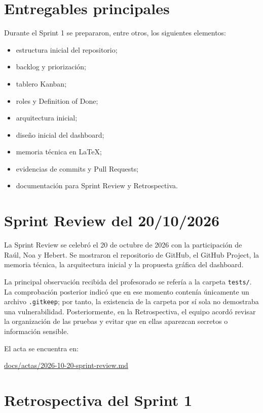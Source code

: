 \documentclass[11pt,a4paper,oneside]{report}
\newcommand{\src}[2]{\href{#1}{#2}}
\begin{document}
\section{Entregables principales}

Durante el Sprint 1 se prepararon, entre otros, los siguientes elementos:

\begin{itemize}
\item estructura inicial del repositorio;
\item backlog y priorización;
\item tablero Kanban;
\item roles y Definition of Done;
\item arquitectura inicial;
\item diseño inicial del dashboard;
\item memoria técnica en LaTeX;
\item evidencias de commits y Pull Requests;
\item documentación para Sprint Review y Retrospectiva.
\end{itemize}

\section{Sprint Review del 20/10/2026}

La Sprint Review se celebró el 20 de octubre de 2026 con la participación de Raúl, Noa y Hebert. Se mostraron el repositorio de GitHub, el GitHub Project, la memoria técnica, la arquitectura inicial y la propuesta gráfica del dashboard.

La principal observación recibida del profesorado se refería a la carpeta \texttt{tests/}. La comprobación posterior indicó que en ese momento contenía únicamente un archivo \texttt{.gitkeep}; por tanto, la existencia de la carpeta por sí sola no demostraba una vulnerabilidad. Posteriormente, en la Retrospectiva, el equipo acordó revisar la organización de las pruebas y evitar que en ellas aparezcan secretos o información sensible.

El acta se encuentra en:

\src{https://github.com/rrrarrra9/AhorraTenergia/blob/main/docs/actas/2026-10-20-sprint-review.md}{docs/actas/2026-10-20-sprint-review.md}

\section{Retrospectiva del Sprint 1}
\end{document}
